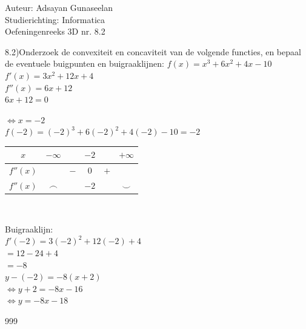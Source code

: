 \documentclass[a4paper]{article}
\begin{document}
\noindent \large Auteur: Adsayan Gunaseelan \\
\noindent \large Studierichting: Informatica\\
\noindent \large Oefeningenreeks 3D nr. 8.2\\

\medskip

\normalsize

8.2)Onderzoek de convexiteit en concaviteit van de volgende functies, en bepaal de eventuele buigpunten en
buigraaklijnen: $f(x)=x^3+6x^2+4x-10$\\

$f'(x)= 3x^2+12x+4$\\

$f''(x)= 6x+12$\\

$ 6x +12 = 0$

$\Leftrightarrow x=-2$\\

$f(-2) = (-2)^3 +6(-2)^2+4(-2)-10 =-2 $\\


\begin{tabular}{c|ccccc}
$x$ & $-\infty$ &  & $-2$ &  & $+\infty$\\ \hline
$f''(x)$ &  & $-$ & $0$ & $+$ & \\
$f''(x)$ & $\frown$  &  & $-2$ &  & $\smile$\\
\end{tabular}\

Buigraaklijn:\\

$f'(-2)=3(-2)^2+12(-2)+4$\\

$=12-24+4$\\

$=-8$\\

$y-(-2)=-8(x+2)$\\

$\Leftrightarrow y+2=-8x-16$\\

$\Leftrightarrow y=-8x-18$\\

\begin{thebibliography}{999}
\end{thebibliography}
\end{document}
